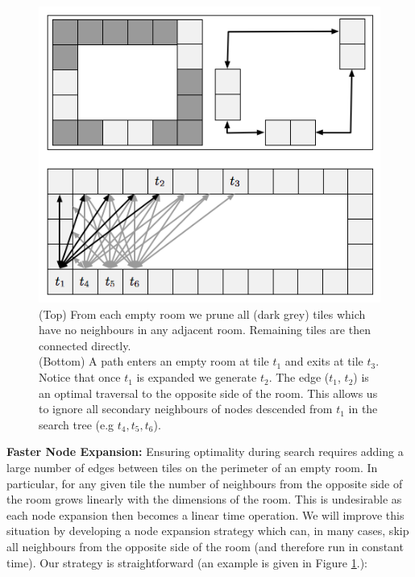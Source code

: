 \begin{figure}[t]
       \begin{center}
                       \includegraphics[scale=0.5, trim = 10mm 10mm 10mm 0mm]{diagrams/branching.png}
       \end{center}
	\vspace{-3pt}
       \caption{(Top) From each empty room we prune all (dark grey) tiles which have no neighbours in any adjacent room. 
Remaining tiles are then connected directly.
\\
		(Bottom) A path enters an empty room at tile $t_{1}$ and exits at tile $t_{3}$. Notice that once
$t_{1}$ is expanded we generate $t_{2}$. The edge ($t_{1}$, $t_{2}$) is an optimal traversal to the opposite side of the room.
This allows us to ignore all secondary neighbours of nodes descended from $t_{1}$ in the search
tree (e.g $t_{4}, t_{5}, t_{6}$).
}
       \label{fig-branching}
\end{figure}

\par \noindent \newline
\textbf{Faster Node Expansion:} 
Ensuring optimality during search requires adding a large number of edges between tiles on the perimeter of an empty
room.
In particular, for any given tile the number of neighbours from the opposite side of the room grows linearly with the
dimensions of the room.
This is undesirable as each node expansion then becomes a linear time operation. 
We will improve this situation by developing a node expansion strategy which can, in many cases, skip all neighbours from 
the opposite side of the room (and therefore run in constant time).
Our strategy is straightforward (an example is given in Figure \ref{fig-branching}.):

